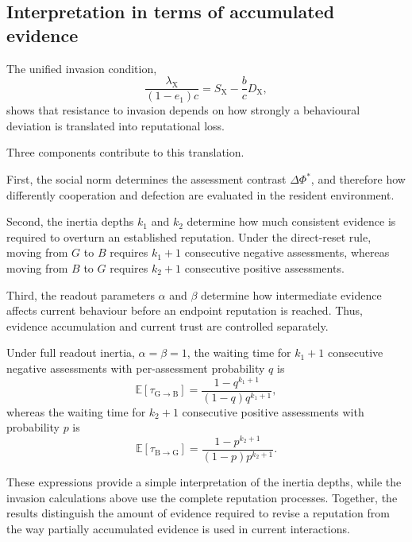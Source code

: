 \documentclass[fleqn,10pt]{wlscirep}
\begin{document}
\subsection{Interpretation in terms of accumulated evidence}

The unified invasion condition,
\begin{equation}
\frac{\lambda_\mathrm X}{(1-e_1)c}
=
S_\mathrm X-\frac{b}{c}D_\mathrm X,
\end{equation}
shows that resistance to invasion depends on how strongly a behavioural deviation is translated into reputational loss.

Three components contribute to this translation.

First, the social norm determines the assessment contrast $\Delta\Phi^*$, and therefore how differently cooperation and defection are evaluated in the resident environment.

Second, the inertia depths $k_1$ and $k_2$ determine how much consistent evidence is required to overturn an established reputation.
Under the direct-reset rule, moving from $G$ to $B$ requires $k_1+1$ consecutive negative assessments, whereas moving from $B$ to $G$ requires $k_2+1$ consecutive positive assessments.

Third, the readout parameters $\alpha$ and $\beta$ determine how intermediate evidence affects current behaviour before an endpoint reputation is reached.
Thus, evidence accumulation and current trust are controlled separately.

Under full readout inertia, $\alpha=\beta=1$, the waiting time for $k_1+1$ consecutive negative assessments with per-assessment probability $q$ is
\begin{equation}
\mathbb{E}[\tau_{\mathrm G\rightarrow \mathrm B}]
=
\frac{1-q^{k_1+1}}
{(1-q)q^{k_1+1}},
\end{equation}
whereas the waiting time for $k_2+1$ consecutive positive assessments with probability $p$ is
\begin{equation}
\mathbb{E}[\tau_{\mathrm B\rightarrow \mathrm G}]
=
\frac{1-p^{k_2+1}}
{(1-p)p^{k_2+1}}.
\end{equation}

These expressions provide a simple interpretation of the inertia depths, while the invasion calculations above use the complete reputation processes.
Together, the results distinguish the amount of evidence required to revise a reputation from the way partially accumulated evidence is used in current interactions.
\end{document}
